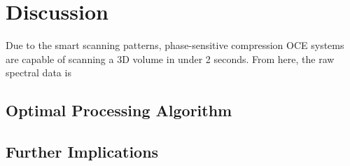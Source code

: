 \chapter{Discussion}
Due to the smart scanning patterns, phase-sensitive compression OCE systems are capable of scanning a 3D volume in under 2 seconds. From here, the raw spectral data is 

\section{Optimal Processing Algorithm}

\section{Further Implications}


